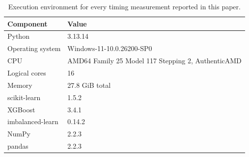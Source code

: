 \begin{table}[htbp]
\centering
\caption{Execution environment for every timing measurement reported in this paper.}
\label{tab:env}
\scriptsize
\begin{tabular}{ll}
\hline
Component & Value \\
\hline
Python & 3.13.14 \\
Operating system & Windows-11-10.0.26200-SP0 \\
CPU & AMD64 Family 25 Model 117 Stepping 2, AuthenticAMD \\
Logical cores & 16 \\
Memory & 27.8 GiB total \\
scikit-learn & 1.5.2 \\
XGBoost & 3.4.1 \\
imbalanced-learn & 0.14.2 \\
NumPy & 2.2.3 \\
pandas & 2.2.3 \\
\hline
\end{tabular}
\end{table}
